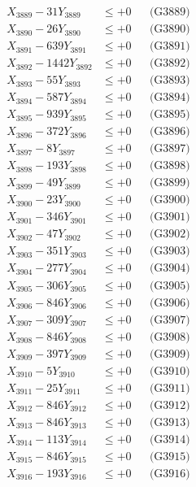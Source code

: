 \documentclass[a4paper,10pt]{article}
\begin{document}
{\begin{align}
X_{3889} - 31Y_{3889} &\leq +0 && \text{(G3889)} \\
X_{3890} - 26Y_{3890} &\leq +0 && \text{(G3890)} \\
\allowbreak
X_{3891} - 639Y_{3891} &\leq +0 && \text{(G3891)} \\
X_{3892} - 1442Y_{3892} &\leq +0 && \text{(G3892)} \\
X_{3893} - 55Y_{3893} &\leq +0 && \text{(G3893)} \\
X_{3894} - 587Y_{3894} &\leq +0 && \text{(G3894)} \\
X_{3895} - 939Y_{3895} &\leq +0 && \text{(G3895)} \\
X_{3896} - 372Y_{3896} &\leq +0 && \text{(G3896)} \\
X_{3897} - 8Y_{3897} &\leq +0 && \text{(G3897)} \\
X_{3898} - 193Y_{3898} &\leq +0 && \text{(G3898)} \\
X_{3899} - 49Y_{3899} &\leq +0 && \text{(G3899)} \\
X_{3900} - 23Y_{3900} &\leq +0 && \text{(G3900)} \\
\allowbreak
X_{3901} - 346Y_{3901} &\leq +0 && \text{(G3901)} \\
X_{3902} - 47Y_{3902} &\leq +0 && \text{(G3902)} \\
X_{3903} - 351Y_{3903} &\leq +0 && \text{(G3903)} \\
X_{3904} - 277Y_{3904} &\leq +0 && \text{(G3904)} \\
X_{3905} - 306Y_{3905} &\leq +0 && \text{(G3905)} \\
X_{3906} - 846Y_{3906} &\leq +0 && \text{(G3906)} \\
X_{3907} - 309Y_{3907} &\leq +0 && \text{(G3907)} \\
X_{3908} - 846Y_{3908} &\leq +0 && \text{(G3908)} \\
X_{3909} - 397Y_{3909} &\leq +0 && \text{(G3909)} \\
X_{3910} - 5Y_{3910} &\leq +0 && \text{(G3910)} \\
\allowbreak
X_{3911} - 25Y_{3911} &\leq +0 && \text{(G3911)} \\
X_{3912} - 846Y_{3912} &\leq +0 && \text{(G3912)} \\
X_{3913} - 846Y_{3913} &\leq +0 && \text{(G3913)} \\
X_{3914} - 113Y_{3914} &\leq +0 && \text{(G3914)} \\
X_{3915} - 846Y_{3915} &\leq +0 && \text{(G3915)} \\
X_{3916} - 193Y_{3916} &\leq +0 && \text{(G3916)} \\

\end{align}}
\end{document}
